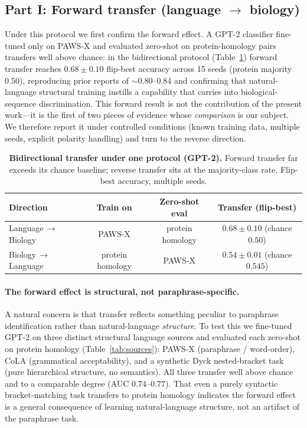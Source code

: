 \documentclass[11pt]{article}
\begin{document}
\subsection{Part I: Forward transfer (language $\rightarrow$ biology)}
Under this protocol we first confirm the forward effect. A GPT-2 classifier fine-tuned only on
PAWS-X and evaluated zero-shot on protein-homology pairs transfers well above chance: in the
bidirectional protocol (Table~\ref{tab:bidir}) forward transfer reaches
$0.68 \pm 0.10$ flip-best accuracy across 15 seeds (protein majority $0.50$), reproducing prior
reports of $\sim$$0.80$--$0.84$ and confirming that natural-language structural training instills a
capability that carries into biological-sequence discrimination. This forward result is not the
contribution of the present work---it is the first of two pieces of evidence whose
\emph{comparison} is our subject. We therefore report it under controlled conditions (known
training data, multiple seeds, explicit polarity handling) and turn to the reverse direction.

\begin{table}[t]
\centering
\caption{\textbf{Bidirectional transfer under one protocol (GPT-2).} Forward transfer far exceeds
its chance baseline; reverse transfer sits at the majority-class rate. Flip-best accuracy,
multiple seeds.}
\label{tab:bidir}
\begin{tabular}{lccc}
\toprule
Direction & Train on & Zero-shot eval & Transfer (flip-best) \\
\midrule
Language\,$\rightarrow$\,Biology & PAWS-X & protein homology & $0.68 \pm 0.10$ \quad (chance $0.50$) \\
Biology\,$\rightarrow$\,Language & protein homology & PAWS-X & $0.54 \pm 0.01$ \quad (chance $0.545$) \\
\bottomrule
\end{tabular}
\end{table}

\paragraph{The forward effect is structural, not paraphrase-specific.} A natural concern is that
transfer reflects something peculiar to paraphrase identification rather than natural-language
\emph{structure}. To test this we fine-tuned GPT-2 on three distinct structural language sources and
evaluated each zero-shot on protein homology (Table~\ref{tab:sources}): PAWS-X (paraphrase /
word-order), CoLA (grammatical acceptability), and a synthetic Dyck nested-bracket task (pure
hierarchical structure, no semantics). All three transfer well above chance and to a comparable
degree (AUC $0.74$--$0.77$). That even a purely syntactic bracket-matching task transfers to protein
homology indicates the forward effect is a general consequence of learning natural-language
structure, not an artifact of the paraphrase task.
\end{document}
